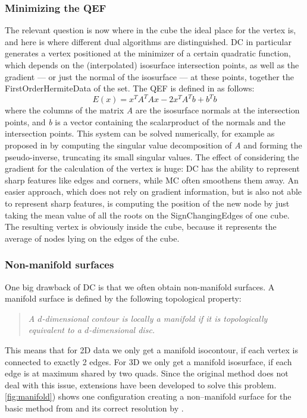 \subsubsection{Minimizing the \acl{QEF}}
The relevant question is now where in the cube the ideal place for the vertex is, and here is where different dual algorithms are distinguished. \Ac{DC} in particular generates a vertex positioned at the minimizer of a certain quadratic function, which depends on the (interpolated) isosurface intersection points, as well as the gradient --- or just the normal of the isosurface --- at these points, together the \acs{FirstOrderHermiteData} of the set.
The \acl{QEF} is defined in \cite{Hermite2002} as follows:
\begin{equation}
\label{eq:QEF}
E(x)= x^TA^TAx-2x^TA^Tb+b^Tb
\end{equation}
where the columns of the matrix \textit{A} are the  isosurface normals at the intersection points, and \textit{b} is a vector containing the scalarproduct of the normals and the intersection points. This system can be solved numerically, for example as proposed in \cite{Hermite2002} by computing the singular value decomposition of \textit{A} and forming the pseudo-inverse, truncating its small singular values. 
The effect of considering the gradient for the calculation of the vertex is huge: \ac{DC} has the ability to represent sharp features like edges and corners, while \ac{MC} often smoothens them away.
An easier approach, which does not rely on gradient information, but is also not able to represent sharp features, is computing the position of the new node by just taking the mean value of all the roots on the \acsp{SignChangingEdge} of one cube. The resulting vertex is obviously inside the cube, because it represents the average of nodes lying on the edges of the cube. 

\subsubsection{Non-manifold surfaces}
One big drawback of \ac{DC} is that we often obtain non-manifold surfaces. A manifold surface is defined by the following topological property:
\begin{quote}
\emph{A $d$-dimensional contour is locally a \emph{manifold} if it is topologically equivalent to a $d$-dimensional disc.}\cite{Hermite2002}
\end{quote}
This means that for 2D data we only get a manifold isocontour, if each vertex is connected to exactly 2 edges. For 3D we only get a manifold isosurface, if each edge is at maximum shared by two \acp{quad}. Since the original method does not deal with this issue, extensions have been developed to solve this problem.\autoref{fig:manifold}) shows one configuration creating a non--manifold surface for the basic method from \cite{Hermite2002} and its correct resolution by \cite{Schaefer2007}.


